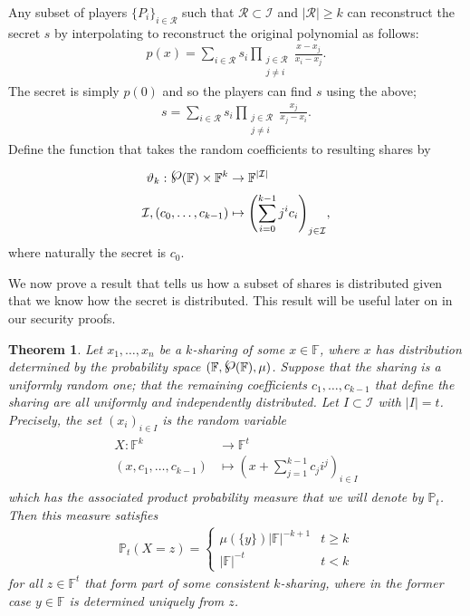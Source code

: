 \documentclass{article}
\newcommand{\powerset}{\raisebox{.15\baselineskip}{\Large\ensuremath{\wp}}}
\newtheorem{theorem}{Theorem}
\theoremstyle{remark}
\newcommand{\F}{\mathbb{F}}
\renewcommand{\P}{\mathbb{P}}
\begin{document}
Any subset of players ${\{P_i\}}_{i \in \mathcal{R}}$ such that $\mathcal{R}
\subset \mathcal{I}$ and $|\mathcal{R}| \ge k$ can reconstruct the secret $s$
by interpolating to reconstruct the original polynomial as follows:
\begin{align*}
	p(x)
	=
	\sum_{i \in \mathcal{R}}
		s_i
		\prod_{\substack{j \in \mathcal{R}\\j \ne i}}
			\frac{x - x_j}{x_i - x_j}.
\end{align*}
The secret is simply $p(0)$ and so the players can find $s$ using the above;
\begin{align*}
	s = \sum_{i \in \mathcal{R}}
		s_i
		\prod_{\substack{j \in \mathcal{R}\\j \ne i}}
			\frac{x_j}{x_j - x_i}.
\end{align*}
Define the function that takes the random coefficients to resulting shares by
\begin{align*}
	\spl:
	\powerset(\F) \times \F^k &\to \F^{|\mathcal{I}|}\\
	\mathcal{I}, (c_0, \ldots, c_{k-1})
	&\mapsto
	{\left(\sum_{i=0}^{k-1} j^i c_i\right)}_{j \in \mathcal{I}},
\end{align*}
where naturally the secret is $c_0$.

We now prove a result that tells us how a subset of shares is distributed given
that we know how the secret is distributed. This result will be useful later on
in our security proofs.

\begin{theorem}\label{thm:shareDist}
	Let $x_1, \ldots, x_n$ be a $k$-sharing of some $x \in \F$, where $x$ has
	distribution determined by the probability space $(\F, \powerset(\F),
	\mu)$. Suppose that the sharing is a uniformly random one; that the
	remaining coefficients $c_1, \ldots, c_{k-1}$ that define the sharing are
	all uniformly and independently distributed. Let $I \subset \mathcal{I}$
	with $|I| = t$. Precisely, the set ${(x_i)}_{i \in I}$ is the random
	variable
	\begin{align}\label{eq:shareDist}
		\begin{aligned}
			X: \F^k &\to \F^t\\
			(x, c_1, \ldots, c_{k-1}) &\mapsto
			{\left(x + \sum_{j=1}^{k-1} c_j i^j\right)}_{i \in I}
		\end{aligned}
	\end{align}
	which has the associated product probability measure that we will denote by
	$\P_t$. Then this measure satisfies
	\begin{align*}
		\P_t(X = z) =
		\begin{cases}
			\mu(\{y\})|\F|^{-k+1} & t \ge k\\
			|\F|^{-t} & t < k
		\end{cases}
	\end{align*}
	for all $z \in \F^t$ that form part of some consistent $k$-sharing, where
	in the former case $y \in \F$ is determined uniquely from $z$.
\end{theorem}
\end{document}
